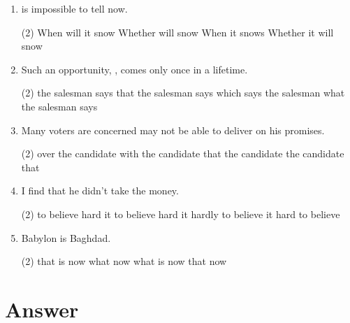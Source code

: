 \begin{enumerate}
\item \ttu is impossible to tell now.
\begin{tasks}(2)
  \task When will it snow
  \task Whether will snow
  \task When it snows
  \task Whether it will snow
\end{tasks}

\item Such an opportunity, \ttu, comes only once in a lifetime.
\begin{tasks}(2)
  \task the salesman says
  \task that the salesman says
  \task which says the salesman
  \task what the salesman says
\end{tasks}

\item Many voters are concerned \ttu may not be able to deliver on his promises.
\begin{tasks}(2)
  \task over the candidate
  \task with the candidate
  \task that the candidate
  \task the candidate that
\end{tasks}

\item I find \ttu that he didn't take the money.
\begin{tasks}(2)
  \task to believe hard
  \task it to believe hard
  \task it hardly to believe
  \task it hard to believe
\end{tasks}

\item Babylon is \ttu Baghdad.
\begin{tasks}(2)
  \task that is now
  \task what now
  \task what is now
  \task that now
\end{tasks}

\end{enumerate}

\section{Answer}

